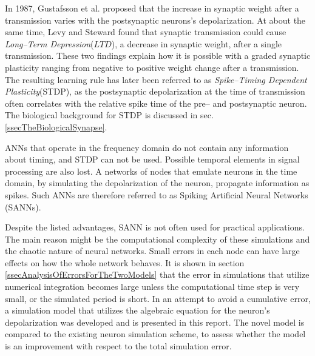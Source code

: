 	In 1987, Gustafsson et al. proposed that the increase in synaptic weight after a transmission varies with the postsynaptic neurons's depolarization\cite{Gustafsson03011987}. 
	At about the same time, Levy and Steward found that synaptic transmission could cause \emph{Long--Term Depression}($LTD$), a decrease in synaptic weight, after a single transmission\cite{Levy1983791LTDetterSTDP}. 
	These two findings explain how it is possible with a graded synaptic plasticity ranging from negative to positive weight change after a transmission. 
	The resulting learning rule has later been referred to as \emph{Spike--Timing Dependent Plasticity}(STDP), as the postsynaptic depolarization at the time of transmission often correlates with the relative spike time of the pre-- and postsynaptic neuron\cite{reviewSTDP}.
	The biological background for STDP is discussed in sec. \ref{ssecTheBiologicalSynapse}.



	ANNs that operate in the frequency domain do not contain any information about timing, and STDP can not be used.
	Possible temporal elements in signal processing are also lost.
	A networks of nodes that emulate neurons in the time domain, by simulating the depolarization of the neuron, propagate information as spikes.
	Such ANNs are therefore referred to as Spiking Artificial Neural Networks (SANNs)\cite{gerstnerKistler2002}.
	

	Despite the listed advantages, SANN is not often used for practical applications. 
	The main reason might be the computational complexity of these simulations and the chaotic nature of neural networks. 
	Small errors in each node can have large effects on how the whole network behaves.
	It is shown in section \ref{ssecAnalysisOfErrorsForTheTwoModels} that the error in simulations that utilize numerical integration becomes large unless the computational time step is very small, 
		or the simulated period is short.
	In an attempt to avoid a cumulative error, a simulation model that utilizes the algebraic equation for the neuron's depolarization was developed %
		and is presented in this report.
	The novel model is compared to the existing neuron simulation scheme, to assess whether the model is an improvement with respect to the total simulation error.
	

